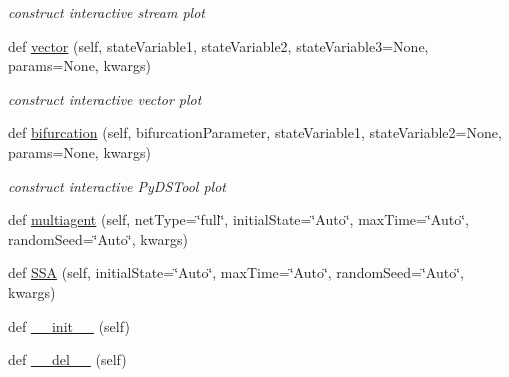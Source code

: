 \begin{DoxyCompactItemize}
\begin{DoxyCompactList}\small\item\em construct interactive stream plot \end{DoxyCompactList}\item 
def \hyperlink{class_mu_mo_t_1_1_mu_mo_t_1_1_mu_mo_tmodel_a1c44daee619f1124bcd661f400864dfa}{vector} (self, state\+Variable1, state\+Variable2, state\+Variable3=None, params=None, kwargs)
\begin{DoxyCompactList}\small\item\em construct interactive vector plot \end{DoxyCompactList}\item 
def \hyperlink{class_mu_mo_t_1_1_mu_mo_t_1_1_mu_mo_tmodel_a2f69e41c1c2d862ed3815a6de1fe79bf}{bifurcation} (self, bifurcation\+Parameter, state\+Variable1, state\+Variable2=None, params=None, kwargs)
\begin{DoxyCompactList}\small\item\em construct interactive Py\+D\+S\+Tool plot \end{DoxyCompactList}\item 
def \hyperlink{class_mu_mo_t_1_1_mu_mo_t_1_1_mu_mo_tmodel_a55f7cab206306b09d38863395f186dbc}{multiagent} (self, net\+Type=\char`\"{}full\char`\"{}, initial\+State=\char`\"{}Auto\char`\"{}, max\+Time=\char`\"{}Auto\char`\"{}, random\+Seed=\char`\"{}Auto\char`\"{}, kwargs)
\item 
def \hyperlink{class_mu_mo_t_1_1_mu_mo_t_1_1_mu_mo_tmodel_ac3c78f7f98887f29a4f0d50dd023c465}{S\+SA} (self, initial\+State=\char`\"{}Auto\char`\"{}, max\+Time=\char`\"{}Auto\char`\"{}, random\+Seed=\char`\"{}Auto\char`\"{}, kwargs)
\item 
def \hyperlink{class_mu_mo_t_1_1_mu_mo_t_1_1_mu_mo_tmodel_ae64f0875afe3067b97ba370b354b9213}{\+\_\+\+\_\+init\+\_\+\+\_\+} (self)
\item 
def \hyperlink{class_mu_mo_t_1_1_mu_mo_t_1_1_mu_mo_tmodel_a41a65d7030dd1006b177d0bc24e1a12b}{\+\_\+\+\_\+del\+\_\+\+\_\+} (self)
\end{DoxyCompactItemize}
